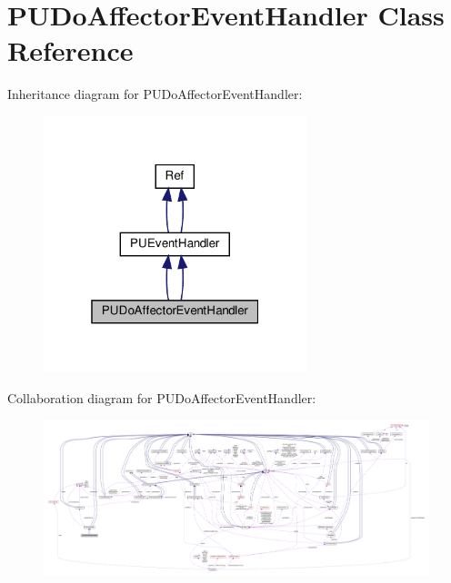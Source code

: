 \hypertarget{classPUDoAffectorEventHandler}{}\section{P\+U\+Do\+Affector\+Event\+Handler Class Reference}
\label{classPUDoAffectorEventHandler}


Inheritance diagram for P\+U\+Do\+Affector\+Event\+Handler\+:
\nopagebreak
\begin{figure}[H]
\begin{center}
\leavevmode
\includegraphics[width=217pt]{classPUDoAffectorEventHandler__inherit__graph}
\end{center}
\end{figure}


Collaboration diagram for P\+U\+Do\+Affector\+Event\+Handler\+:
\nopagebreak
\begin{figure}[H]
\begin{center}
\leavevmode
\includegraphics[width=350pt]{classPUDoAffectorEventHandler__coll__graph}
\end{center}
\end{figure}
